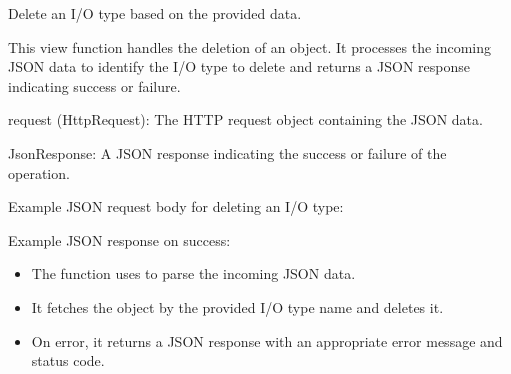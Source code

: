 \documentclass[letterpaper,10pt,english]{sphinxmanual}
\begin{document}

\begin{fulllineitems}
\label{\detokenize{app:app.views.delete_iotype}}
\pysigstartsignatures
{}
\pysigstopsignatures
\sphinxAtStartPar
Delete an I/O type based on the provided data.

\sphinxAtStartPar
This view function handles the deletion of an  object. It processes 
the incoming JSON data to identify the I/O type to delete and returns a 
JSON response indicating success or failure.
\begin{description}
\sphinxAtStartPar
request (HttpRequest): The HTTP request object containing the JSON data.

\sphinxAtStartPar
JsonResponse: A JSON response indicating the success or failure of the operation.

\sphinxAtStartPar
Example JSON request body for deleting an I/O type:

\begin{sphinxVerbatim}[commandchars=\\\{\}]
\end{sphinxVerbatim}

\sphinxAtStartPar
Example JSON response on success:

\begin{sphinxVerbatim}[commandchars=\\\{\}]
\end{sphinxVerbatim}

\begin{itemize}
\item {} 
\sphinxAtStartPar
The function uses  to parse the incoming JSON data.

\item {} 
\sphinxAtStartPar
It fetches the  object by the provided I/O type name and deletes it.

\item {} 
\sphinxAtStartPar
On error, it returns a JSON response with an appropriate error message and status code.

\end{itemize}

\end{description}

\end{fulllineitems}
\end{document}
